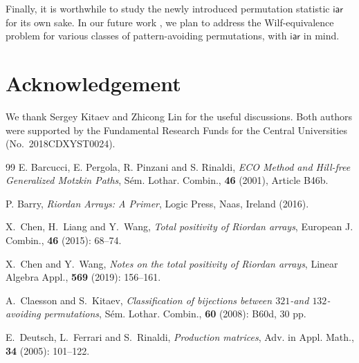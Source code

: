 \documentclass[11pt,reqno]{amsart}
\numberwithin{equation}{section}
\theoremstyle{plain}
\theoremstyle{definition}
\def\iar{\mathsf{iar}}
\begin{document}
Finally, it is worthwhile to study the newly introduced permutation statistic $\iar$ for its own sake. In our future work \cite{FLW}, we plan to address the Wilf-equivalence problem for various classes of pattern-avoiding permutations, with $\iar$ in mind.


\section*{Acknowledgement}
We thank Sergey Kitaev and Zhicong Lin for the useful discussions. Both authors were supported by the Fundamental Research Funds for the Central Universities (No.~2018CDXYST0024). 



\begin{thebibliography}{99}
 E. Barcucci, E. Pergola, R. Pinzani and S. Rinaldi, \textit{ECO Method and Hill-free Generalized Motzkin Paths}, S\'{e}m. Lothar. Combin., \textbf{46} (2001), Article B46b.

 P. Barry, \textit{Riordan Arrays: A Primer}, Logic Press, Naas, Ireland (2016).



 X.~Chen, H.~Liang and Y.~Wang, \textit{Total positivity of Riordan arrays}, European J. Combin., {\bf 46} (2015): 68--74.

 X.~Chen and Y.~Wang, \textit{Notes on the total positivity of Riordan arrays}, Linear Algebra Appl., {\bf 569} (2019): 156--161.

 A.~Claesson and S.~Kitaev, \textit{Classification of bijections between $321$-and $132$-avoiding permutations}, S\'em. Lothar. Combin., {\bf 60} (2008): B60d, 30 pp.

 E.~Deutsch, L.~Ferrari and S.~Rinaldi, \textit{Production matrices}, Adv. in Appl. Math., {\bf 34} (2005): 101--122.



\end{thebibliography}
\end{document}
